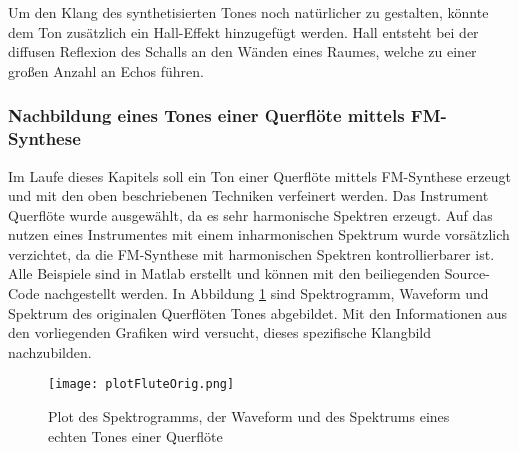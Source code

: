 Um den Klang des synthetisierten Tones noch natürlicher zu gestalten, könnte dem Ton zusätzlich ein Hall-Effekt hinzugefügt werden. Hall entsteht bei der diffusen Reflexion des Schalls an den Wänden eines Raumes, welche zu einer großen Anzahl an Echos führen. \cite[S. 108]{stotz}


\FloatBarrier
\subsubsection{Nachbildung eines Tones einer Querflöte mittels FM-Synthese}

Im Laufe dieses Kapitels soll ein Ton einer Querflöte mittels FM-Synthese erzeugt und mit den oben beschriebenen Techniken verfeinert werden. Das Instrument Querflöte wurde ausgewählt, da es sehr harmonische Spektren erzeugt. Auf das nutzen eines Instrumentes mit einem inharmonischen Spektrum wurde vorsätzlich verzichtet, da die FM-Synthese mit harmonischen Spektren kontrollierbarer ist. Alle Beispiele sind in Matlab erstellt und können mit den beiliegenden Source-Code nachgestellt werden. In Abbildung \ref{fig:plotFluteOrig} sind Spektrogramm, Waveform und Spektrum des originalen Querflöten Tones abgebildet. Mit den Informationen aus den vorliegenden Grafiken wird versucht, dieses spezifische Klangbild nachzubilden.

\begin{figure} [h!t!b!]
\centering
  \texttt{[image: plotFluteOrig.png]}
\caption{Plot des Spektrogramms, der Waveform und des Spektrums eines echten Tones einer Querflöte}
\label{fig:plotFluteOrig}
\end{figure}

